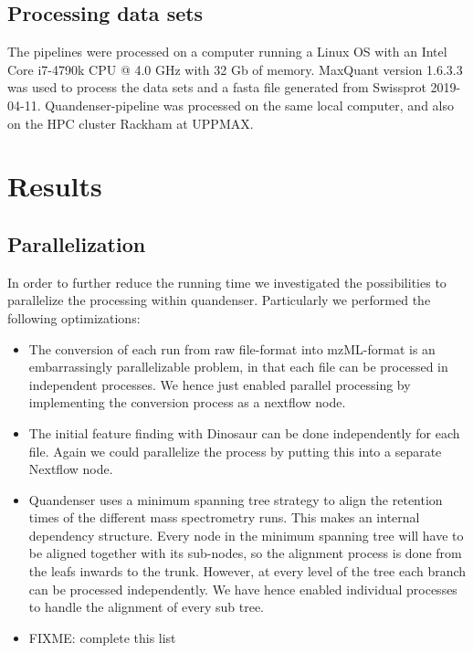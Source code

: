 \documentclass[11pt]{article}
\begin{document}
\subsection*{Processing data sets}
The pipelines were processed on a computer running a Linux OS with an Intel Core i7-4790k CPU @ 4.0 GHz with 32 Gb of
memory. MaxQuant version 1.6.3.3 was used to process the data sets and a fasta file generated from Swissprot 2019-04-11. Quandenser-pipeline was processed on the same local computer, and also on the HPC cluster Rackham at UPPMAX.

\section*{Results}

\subsection*{Parallelization}
In order to further reduce the running time we investigated the possibilities to parallelize the processing within quandenser. Particularly we performed the following optimizations:
\begin{itemize}
  \item The conversion of each run from raw file-format into mzML-format is an embarrassingly parallelizable problem, in that each file can be processed in independent processes. We hence just enabled parallel processing by implementing the conversion process as a nextflow node.
  \item The initial feature finding with Dinosaur\cite{teleman2016dinosaur} can be done independently for each file. Again we could parallelize the process by putting this into a separate Nextflow node.
  \item Quandenser uses a minimum spanning tree strategy \cite{rost2016tric} to align the retention times of the different mass spectrometry runs. This makes an internal dependency structure. Every node in the minimum spanning tree will have to be aligned together with its sub-nodes, so the alignment process is done from the leafs inwards to the trunk.  However, at every level of the tree each branch can be processed independently. We have hence enabled individual processes to handle the alignment of every sub tree.
  \item FIXME: complete this list
\end{itemize}
\end{document}
